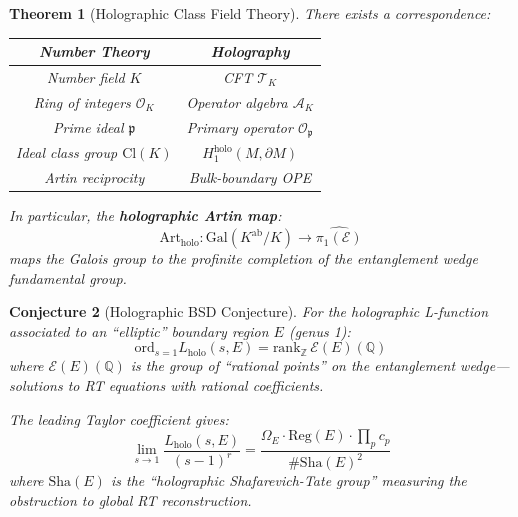 \documentclass[12pt,a4paper]{article}
\newtheorem{theorem}{Theorem}[section]
\newtheorem{conjecture}[theorem]{Conjecture}
\begin{document}
\begin{theorem}[Holographic Class Field Theory]\label{thm:holo-cft}
There exists a correspondence:
\begin{center}
\begin{tabular}{c|c}
\textbf{Number Theory} & \textbf{Holography} \\
\hline
Number field $K$ & CFT $\mathcal{T}_K$ \\
Ring of integers $\mathcal{O}_K$ & Operator algebra $\mathcal{A}_K$ \\
Prime ideal $\mathfrak{p}$ & Primary operator $\mathcal{O}_\mathfrak{p}$ \\
Ideal class group $\text{Cl}(K)$ & $H_1^{\text{holo}}(M, \partial M)$ \\
Artin reciprocity & Bulk-boundary OPE \\
\end{tabular}
\end{center}

In particular, the \textbf{holographic Artin map}:
\begin{equation}
\text{Art}_{\text{holo}}: \text{Gal}(K^{\text{ab}}/K) \to \widehat{\pi_1(\mathcal{E})}
\end{equation}
maps the Galois group to the profinite completion of the entanglement wedge fundamental group.
\end{theorem}

\begin{conjecture}[Holographic BSD Conjecture]\label{conj:holo-bsd}
For the holographic L-function associated to an ``elliptic'' boundary region $E$ (genus 1):
\begin{equation}
\text{ord}_{s=1} L_{\text{holo}}(s, E) = \text{rank}_{\mathbb{Z}} \, \mathcal{E}(E)(\mathbb{Q})
\end{equation}
where $\mathcal{E}(E)(\mathbb{Q})$ is the group of ``rational points'' on the entanglement wedge---solutions to RT equations with rational coefficients.

The leading Taylor coefficient gives:
\begin{equation}
\lim_{s \to 1} \frac{L_{\text{holo}}(s,E)}{(s-1)^r} = \frac{\Omega_E \cdot \text{Reg}(E) \cdot \prod_p c_p}{\#\text{Sha}(E)^2}
\end{equation}
where $\text{Sha}(E)$ is the ``holographic Shafarevich-Tate group'' measuring the obstruction to global RT reconstruction.
\end{conjecture}

\end{document}
